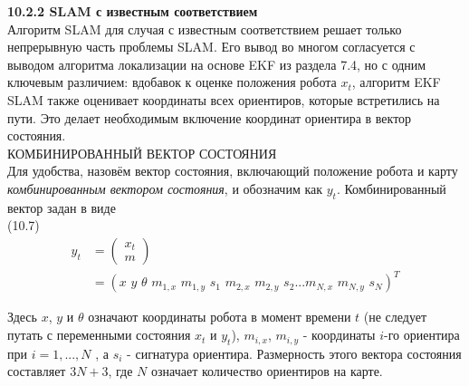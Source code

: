 \documentclass[10pt,a4paper]{article}
\begin{document}
\textbf{10.2.2 SLAM с известным соответствием}\\

Алгоритм SLAM для случая с известным соответствием решает только непрерывную часть проблемы SLAM. Его вывод во многом согласуется с выводом алгоритма локализации на основе EKF из раздела 7.4, но с одним ключевым различием: вдобавок к оценке положения робота $x_t$, алгоритм EKF SLAM также оценивает координаты всех ориентиров, которые встретились на пути. Это делает необходимым включение координат ориентира в вектор состояния.\\

КОМБИНИРОВАННЫЙ ВЕКТОР СОСТОЯНИЯ\\

Для удобства, назовём вектор состояния, включающий положение робота и карту \textit{комбинированным вектором состояния}, и обозначим как $y_t$. Комбинированный вектор задан в виде\\
(10.7)
\begin{equation*}
\begin{split}
y_t&=\left(\begin{array}{c} x_t\\
m  
\end{array} \right)\\
&=(x\,\,y\,\,\theta\,\,m_{1,x}\,\,m_{1,y}\,\,s_1\,\,m_{2,x}\,\,m_{2,y}\,\,s_2...m_{N,x}\,\,m_{N,y}\,\,s_N)^T
\end{split}
\end{equation*}

Здесь $x$, $y$ и $\theta$ означают координаты робота в момент времени $t$ (не следует путать с переменными состояния $x_t$ и $y_t$), $m_{i,x}$, $m_{i,y}$ - координаты $i$-го ориентира при $i = 1,...,N$ , а $s_i$  - сигнатура ориентира. Размерность этого вектора состояния составляет $3N+3$, где $N$ означает количество ориентиров на карте.
\end{document}
